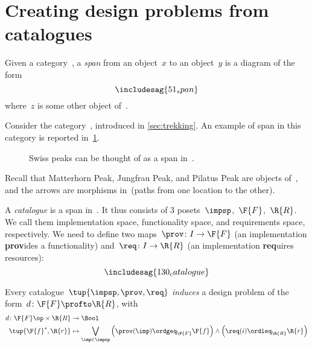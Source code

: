 
\section{Creating design problems from catalogues}
\begin{ctdefinition}[Span]\label{def:span}
  Given a category~\CatC, a \emph{span} from an object~$x$ to an object~$y$ is a diagram of the form
  \begin{equation}
    \includesag{51_span}
  \end{equation}
  where~$z$ is some other object of~\CatC.
\end{ctdefinition}

\begin{example}
  Consider the category~\Trek, introduced in \cref{sec:trekking}. An example of span in this category is reported in~\cref{fig:exmountains}.
  \begin{figure}[h!]
    \begin{center}
    \end{center}
    \caption{Swiss peaks can be thought of as a span in~\Trek. \label{fig:exmountains}}
  \end{figure}
  Recall that \textsf{Matterhorn Peak}, \textsf{Jungfrau Peak}, and \textsf{Pilatus Peak} are objects of~\Trek, and the arrows are morphisms in~\Trek (paths from one location to the other).
\end{example}

\begin{definition}[Catalogue]
  \label{def:catalogue}
  A \emph{catalogue} is a span in~\Pos.
  It thus consists of 3 posets~$\impsp$,~$\F{F}$,~$\R{R}$.
  We call them implementation space, functionality space, and requirements space, respectively. We need to define two maps~$\prov \colon I \to \F{F}$ (an implementation \textbf{prov}ides a functionality) and~$\req\colon I \to \R{R}$ (an implementation \textbf{req}uires resources):
  \begin{equation}
    \includesag{130_catalogue}
  \end{equation}
\end{definition}

\begin{definition}
  Every catalogue~$\tup{\impsp,\prov,\req}$ \emph{induces} a design problem of the form~$d\colon \F{F}\profto \R{R}$, with
  \begin{equation}
    \begin{aligned}
      d\colon \F{F}\op \times \R{R}&\to \Bool\\
      \tup{\F{f}^*,\R{r}}&\mapsto \bigvee_{\imp\in \impsp}\left(\prov(\imp)\ordgeq_{\F{F}}\F{f} \right)\wedge \left( \req(i)\ordleq_{\R{R}}\R{r}\right)
    \end{aligned}
  \end{equation}
\end{definition}

